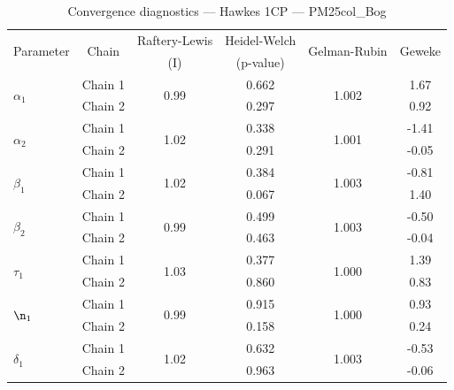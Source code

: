 \begin{table}[H]
\centering
\caption{Convergence diagnostics — Hawkes 1CP — PM25col_Bog}
\begin{tabular}{lccccc}
\toprule
\multirow{2}{*}{Parameter} & \multirow{2}{*}{Chain} & Raftery-Lewis & Heidel-Welch & \multirow{2}{*}{Gelman-Rubin} & \multirow{2}{*}{Geweke} \\
 & & (I) & (p-value) & & (z) \\
\midrule
\multirow{2}{*}{$\alpha_1$} & Chain 1 & \multirow{2}{*}{0.99} & 0.662 & \multirow{2}{*}{1.002} & 1.67 \\
 & Chain 2 & & 0.297 & & 0.92 \\
\multirow{2}{*}{$\alpha_2$} & Chain 1 & \multirow{2}{*}{1.02} & 0.338 & \multirow{2}{*}{1.001} & -1.41 \\
 & Chain 2 & & 0.291 & & -0.05 \\
\midrule
\multirow{2}{*}{$\beta_1$} & Chain 1 & \multirow{2}{*}{1.02} & 0.384 & \multirow{2}{*}{1.003} & -0.81 \\
 & Chain 2 & & 0.067 & & 1.40 \\
\multirow{2}{*}{$\beta_2$} & Chain 1 & \multirow{2}{*}{0.99} & 0.499 & \multirow{2}{*}{1.003} & -0.50 \\
 & Chain 2 & & 0.463 & & -0.04 \\
\midrule
\multirow{2}{*}{$\tau_1$} & Chain 1 & \multirow{2}{*}{1.03} & 0.377 & \multirow{2}{*}{1.000} & 1.39 \\
 & Chain 2 & & 0.860 & & 0.83 \\
\midrule
\multirow{2}{*}{$\n_1$} & Chain 1 & \multirow{2}{*}{0.99} & 0.915 & \multirow{2}{*}{1.000} & 0.93 \\
 & Chain 2 & & 0.158 & & 0.24 \\
\midrule
\multirow{2}{*}{$\delta_1$} & Chain 1 & \multirow{2}{*}{1.02} & 0.632 & \multirow{2}{*}{1.003} & -0.53 \\
 & Chain 2 & & 0.963 & & -0.06 \\
\bottomrule
\end{tabular}
\end{table}
